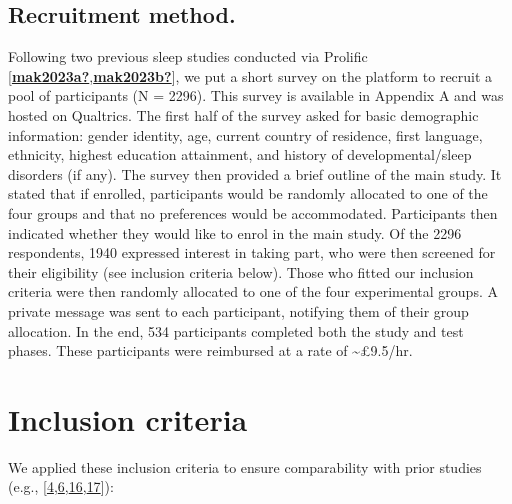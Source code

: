 \documentclass[
]{article}
\begin{document}
\hypertarget{recruitment-method.}{%
\subsection{Recruitment method.}\label{recruitment-method.}}

Following two previous sleep studies conducted via Prolific {[}\protect\hyperlink{ref-mak2023a}{\textbf{mak2023a?}},\protect\hyperlink{ref-mak2023b}{\textbf{mak2023b?}}{]}, we put a short survey on the platform to recruit a pool of participants (N = 2296). This survey is available in Appendix A and was hosted on Qualtrics. The first half of the survey asked for basic demographic information: gender identity, age, current country of residence, first language, ethnicity, highest education attainment, and history of developmental/sleep disorders (if any). The survey then provided a brief outline of the main study. It stated that if enrolled, participants would be randomly allocated to one of the four groups and that no preferences would be accommodated. Participants then indicated whether they would like to enrol in the main study. Of the 2296 respondents, 1940 expressed interest in taking part, who were then screened for their eligibility (see inclusion criteria below). Those who fitted our inclusion criteria were then randomly allocated to one of the four experimental groups. A private message was sent to each participant, notifying them of their group allocation. In the end, 534 participants completed both the study and test phases. These participants were reimbursed at a rate of \textasciitilde£9.5/hr.

\hypertarget{inclusion-criteria}{%
\section{Inclusion criteria}\label{inclusion-criteria}}

We applied these inclusion criteria to ensure comparability with prior studies (e.g., {[}\protect\hyperlink{ref-fenn2009a}{4},\protect\hyperlink{ref-payne2009a}{6},\protect\hyperlink{ref-mckeon2012a}{16},\protect\hyperlink{ref-shaw2017a}{17}{]}):
\end{document}
